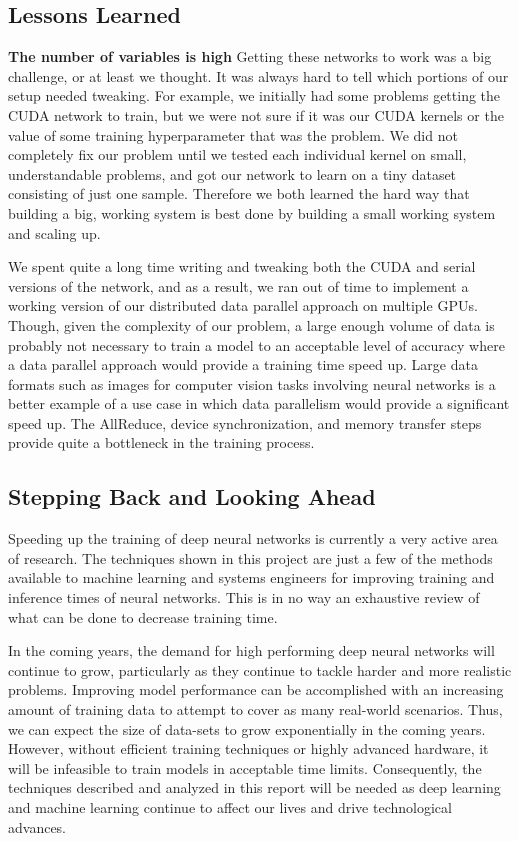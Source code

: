 \documentclass[11pt,a4paper]{article}
\begin{document}
\subsection{Lessons Learned}

\textbf{The number of variables is high} Getting these networks to work was a big challenge, or at least we thought. It was always hard to tell which portions of our setup needed tweaking. For example, we initially had some problems getting the CUDA network to train, but we were not sure if it was our CUDA kernels or the value of some training hyperparameter that was the problem. We did not completely fix our problem until we tested each individual kernel on small, understandable problems, and got our network to learn on a tiny dataset consisting of just one sample. Therefore we both learned the hard way that building a big, working system is best done by building a small working system and scaling up.

We spent quite a long time writing and tweaking both the CUDA and serial versions of the network, and as a result, we ran out of time to implement a working version of our distributed data parallel approach on multiple GPUs. Though, given the complexity of our problem, a large enough volume of data is probably not necessary to train a model to an acceptable level of accuracy where a data parallel approach would provide a training time speed up. Large data formats such as images for computer vision tasks involving neural networks is a better example of a use case in which data parallelism would provide a significant speed up. The AllReduce, device synchronization, and memory transfer steps provide quite a bottleneck in the training process.

\subsection{Stepping Back and Looking Ahead}
Speeding up the training of deep neural networks is currently a very active area of research. The techniques shown in this project are just a few of the methods available to machine learning and systems engineers for improving training and inference times of neural networks. This is in no way an exhaustive review of what can be done to decrease training time. 

In the coming years, the demand for high performing deep neural networks will continue to grow, particularly as they continue to tackle harder and more realistic problems. Improving model performance can be accomplished with an increasing amount of training data to attempt to cover as many real-world scenarios. Thus, we can expect the size of data-sets to grow exponentially in the coming years. However, without efficient training techniques or highly advanced hardware, it will be infeasible to train models in acceptable time limits. Consequently, the techniques described and analyzed in this report will be needed as deep learning and machine learning continue to affect our lives and drive technological advances.



\end{document}
